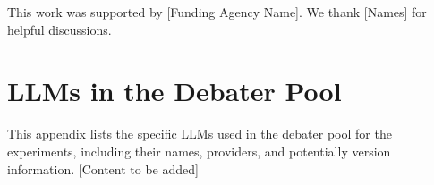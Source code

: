\documentclass{article}
\begin{document}


\begin{ack}


This work was supported by [Funding Agency Name]. We thank [Names] for helpful discussions.
\end{ack}


\appendix

\appendix


\section{LLMs in the Debater Pool}
\label{appendix:llms}
This appendix lists the specific LLMs used in the debater pool for the experiments, including their names, providers, and potentially version information. [Content to be added]
\end{document}
